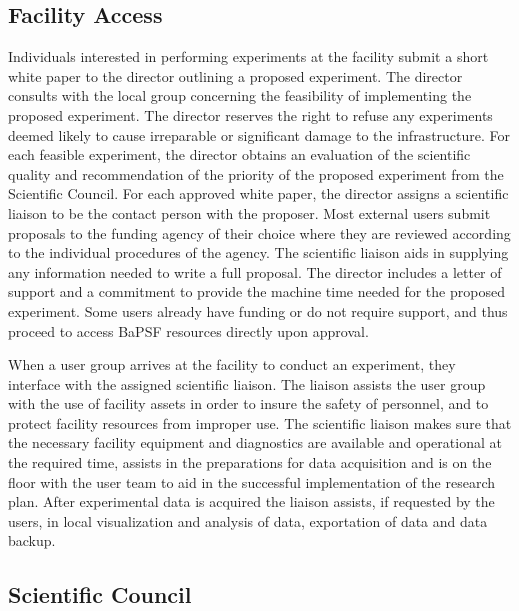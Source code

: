 \documentclass[11pt]{article}
\begin{document}
\subsection{Facility Access}

Individuals interested in performing experiments at the facility
submit a short white paper to the director outlining a proposed
experiment. The director consults with the local group concerning the
feasibility of implementing the proposed experiment. The director
reserves the right to refuse any experiments deemed likely to cause
irreparable or significant damage to the infrastructure. For each
feasible experiment, the director obtains an evaluation of the
scientific quality and recommendation of the priority of the proposed
experiment from the Scientific Council. For each approved white paper,
the director assigns a scientific liaison to be the contact person
with the proposer. Most external users submit proposals to the funding
agency of their choice where they are reviewed according to the
individual procedures of the agency. The scientific liaison aids in
supplying any information needed to write a full proposal. The
director includes a letter of support and a commitment to provide the
machine time needed for the proposed experiment. Some users already
have funding or do not require support, and thus proceed to access
BaPSF resources directly upon approval.

When a user group arrives at the facility to conduct an experiment, they
interface with the assigned scientific liaison. The liaison assists the
user group with the use of facility assets in order to insure the safety
of personnel, and to protect facility resources from improper use. The
scientific liaison makes sure that the necessary facility equipment and
diagnostics are available and operational at the required time, assists
in the preparations for data acquisition and is on the floor with the
user team to aid in the successful implementation of the research plan.
After experimental data is acquired the liaison assists, if requested by
the users, in local visualization and analysis of data, exportation of
data and data backup.

\subsection{Scientific Council}
\end{document}
